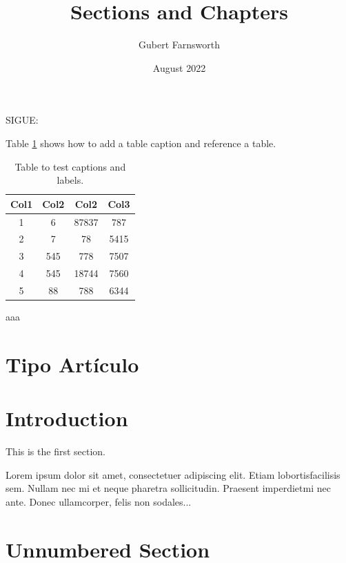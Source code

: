 SIGUE:

Table \ref{table:data} shows how to add a table caption and reference a table.
\begin{table}[h!]
\centering
\begin{tabular}{||c c c c||} 
 \hline
 Col1 & Col2 & Col2 & Col3 \\ [0.5ex] 
 \hline\hline
 1 & 6 & 87837 & 787 \\ 
 2 & 7 & 78 & 5415 \\
 3 & 545 & 778 & 7507 \\
 4 & 545 & 18744 & 7560 \\
 5 & 88 & 788 & 6344 \\ [1ex] 
 \hline
\end{tabular}
\caption{Table to test captions and labels.}
\label{table:data}
\end{table}




aaa











\section*{Tipo Artículo}


\title{Sections and Chapters}
\author{Gubert Farnsworth}
\date{August 2022}

\maketitle
  
\tableofcontents

\section*{Introduction}
   
This is the first section.
      
Lorem  ipsum  dolor  sit  amet,  consectetuer  adipiscing  
elit.   Etiam  lobortisfacilisis sem.  Nullam nec mi et 
neque pharetra sollicitudin.  Praesent imperdietmi nec ante. 
Donec ullamcorper, felis non sodales...
       
\section*{Unnumbered Section}

